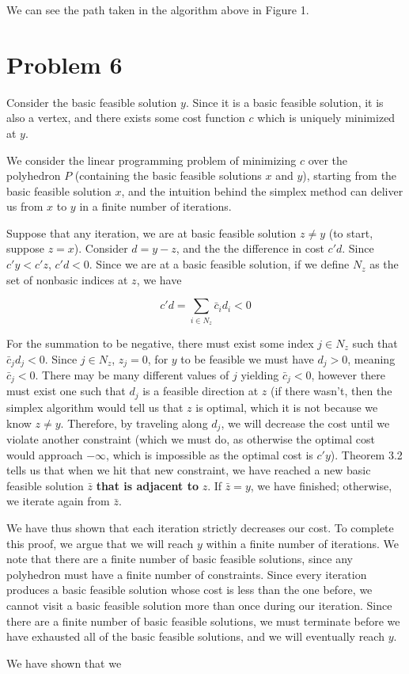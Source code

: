 \documentclass[11pt,a4paper]{article}
\begin{document}
We can see the path taken in the algorithm above in Figure 1.

\section{Problem 6}

Consider the basic feasible solution $y$. Since it is a basic feasible solution, it is also a vertex, and there exists some cost function $c$ which is uniquely minimized at $y$.

We consider the linear programming problem of minimizing $c$ over the polyhedron $P$ (containing the basic feasible solutions $x$ and $y$), starting from the basic feasible solution $x$, and the intuition behind the simplex method can deliver us from $x$ to $y$ in a finite number of iterations.

Suppose that any iteration, we are at basic feasible solution $z\neq y$ (to start, suppose $z=x$). Consider $d=y-z$, and the the difference in cost $c'd$. Since $c'y<c'z$, $c'd<0$. Since we are at a basic feasible solution, if we define $N_z$ as the set of nonbasic indices at $z$, we have 

$$
c'd=\sum_{i\in N_z}\bar{c}_id_i<0
$$

For the summation to be negative, there must exist some index $j\in N_z$ such that $\bar{c}_jd_j<0$. Since $j\in N_z$, $z_j=0$, for $y$ to be feasible we must have $d_j>0$, meaning $\bar{c}_j<0$. There may be many different values of $j$ yielding $\bar{c}_j<0$, however there must exist one such that $d_j$ is a feasible direction at $z$ (if there wasn't, then the simplex algorithm would tell us that $z$ is optimal, which it is not because we know $z\neq y$. Therefore, by traveling along $d_j$, we will decrease the cost until we violate another constraint (which we must do, as otherwise the optimal cost would   approach $-\infty$, which is impossible as the optimal cost is $c'y$). Theorem 3.2 tells us that when we hit that new constraint, we have reached a new basic feasible solution $\bar{z}$ \textbf{that is adjacent to} $z$. If $\bar{z}=y$, we have finished; otherwise, we iterate again from $\bar{z}$.

We have thus shown that each iteration strictly decreases our cost. To complete this proof, we argue that we will reach $y$ within a finite number of iterations. We note that there are a finite number of basic feasible solutions, since any polyhedron must have a finite number of constraints. Since every iteration produces a basic feasible solution whose cost is less than the one before, we cannot visit a basic feasible solution more than once during our iteration. Since there are a finite number of basic feasible solutions, we must terminate before we have exhausted all of the basic feasible solutions, and we will eventually reach $y$.

We have shown that we 
\end{document}

